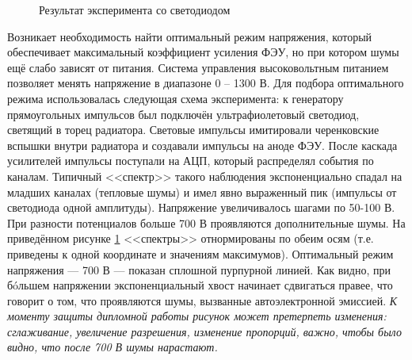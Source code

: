 \documentclass[12pt,a4paper]{report} %
\begin{document}
\begin{figure}[th]
	\noindent{}
	\caption{Результат эксперимента со светодиодом}
	\label{UVlight}
\end{figure}

Возникает необходимость найти оптимальный режим напряжения, который обеспечивает максимальный коэффициент усиления ФЭУ, но при котором шумы ещё слабо зависят от питания. Система управления высоковольтным питанием позволяет менять напряжение в диапазоне 0 -- 1300 В. Для подбора оптимального режима использовалась следующая схема эксперимента: к генератору прямоугольных импульсов был подключён ультрафиолетовый светодиод, светящий в торец радиатора. Световые импульсы имитировали черенковские вспышки внутри радиатора и создавали импульсы на аноде ФЭУ. После каскада усилителей импульсы поступали на АЦП, который распределял события по каналам. Типичный <<спектр>> такого наблюдения экспоненциально спадал на младших каналах (тепловые шумы) и имел явно выраженный пик (импульсы от светодиода одной амплитуды). Напряжение увеличивалось шагами по 50-100 В. При разности потенциалов больше 700 В проявляются дополнительные шумы. На приведённом рисунке \ref{UVlight} <<спектры>> отнормированы по обеим осям (т.е. приведены к одной координате и значениям максимумов). Оптимальный режим напряжения --- 700 В --- показан сплошной пурпурной линией. Как видно, при б\'oльшем напряжении экспоненциальный хвост начинает сдвигаться правее, что говорит о том, что проявляются шумы, вызванные автоэлектронной эмиссией. \textit{К моменту защиты дипломной работы рисунок может претерпеть изменения: сглаживание, увеличение разрешения, изменение пропорций, важно, чтобы было видно, что после 700 В шумы нарастают.}
\end{document}

